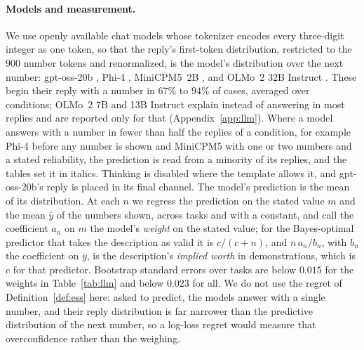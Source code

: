 \documentclass[10pt,twocolumn]{article}
\begin{document}
\paragraph{Models and measurement.} We use openly available chat models whose tokenizer encodes every three-digit integer as one token, so that the reply's first-token distribution, restricted to the $900$ number tokens and renormalized, is the model's distribution over the next number: gpt-oss-20b \citep{openai2025}, Phi-4 \citep{abdin2024}, MiniCPM5~2B \citep{minicpm5}, and OLMo~2 32B Instruct \citep{walsh2025}. These begin their reply with a number in $67\%$ to $94\%$ of cases, averaged over conditions; OLMo~2 7B and 13B Instruct explain instead of answering in most replies and are reported only for that (Appendix~\ref{app:llm}). Where a model answers with a number in fewer than half the replies of a condition, for example Phi-4 before any number is shown and MiniCPM5 with one or two numbers and a stated reliability, the prediction is read from a minority of its replies, and the tables set it in italics. Thinking is disabled where the template allows it, and gpt-oss-20b's reply is placed in its final channel. The model's prediction is the mean of its distribution. At each $n$ we regress the prediction on the stated value $m$ and the mean $\bar y$ of the numbers shown, across tasks and with a constant, and call the coefficient $a_n$ on $m$ the model's \emph{weight} on the stated value; for the Bayes-optimal predictor that takes the description as valid it is $c/(c+n)$, and $n\,a_n/b_n$, with $b_n$ the coefficient on $\bar y$, is the description's \emph{implied worth} in demonstrations, which is $c$ for that predictor. Bootstrap standard errors over tasks are below $0.015$ for the weights in Table~\ref{tab:llm} and below $0.023$ for all. We do not use the regret of Definition~\ref{def:ess} here: asked to predict, the models answer with a single number, and their reply distribution is far narrower than the predictive distribution of the next number, so a log-loss regret would measure that overconfidence rather than the weighing.

\begin{table}[t]
\centering\small
\setlength{\tabcolsep}{2.4pt}
\caption{Weight on the stated value, model against Bayes-optimal, with one and with eight numbers shown ($\sigma = 60$, $2{,}000$ tasks; bootstrap standard errors below $0.015$; italics: the reply begins with a number in fewer than half the cases). $c$ is the description's worth in demonstrations ($\tau = 60$, $30$, $10$). ``Wrong'' is an invalid description worth $36$; ``10\% w.'' and ``50\% w.'' add the sentence stating that chance of being wrong, for a valid description worth $36$ (``wrong, 50\% w.'': for an invalid one). The Bayes-optimal row takes a description as valid unless a reliability is stated, in which case it hedges with that $p$.}
\label{tab:llm}
\vspace{3pt}

\end{table}
\end{document}
